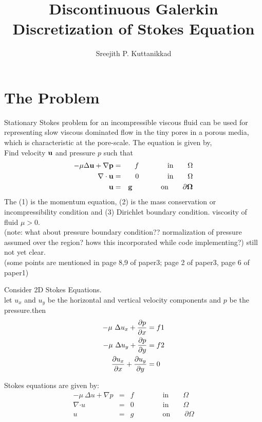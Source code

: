 \documentclass[11pt,a4paper]{article}
\begin{document}
\title {Discontinuous Galerkin Discretization of Stokes Equation} 
\author {Sreejith P. Kuttanikkad}
\maketitle

\section{The Problem}
Stationary  Stokes problem for an incompressible viscous fluid can be used 
for representing slow viscous dominated flow in the tiny pores in a porous media, 
which is characteristic at the pore-scale. The equation is given by,\\
Find velocity $\bf{u}$ and pressure $p$ such that 
\begin{eqnarray}
-\mu \Delta \bf{u}+ \nabla p &=& f \qquad\qquad\text{in} \qquad \Omega \\
\nabla \cdot \bf{u} &=& 0 \qquad\qquad\text{in}\qquad \Omega\\
\bf{u} &=& \bf{g} \qquad\qquad\text{on}\qquad\partial \Omega
\end{eqnarray}
The (1) is the momentum equation, 
(2) is the mass conservation or incompressibility condition and 
(3)  Dirichlet boundary condition. viscosity of fluid $\mu > 0 $. \\
(note: what about pressure boundary condition?? normalization of pressure assumed over the region? hows this incorporated while code implementing?) still not yet clear.\\

(some points are mentioned in page 8,9 of paper3; page 2 of paper3, page 6 of paper1)

Consider 2D Stokes Equations.\\

let $u_{x}$ and $u_{y}$ be the horizontal and vertical velocity components
and $p$ be the pressure.then\\
\begin{equation*}
\begin{aligned}
- \mu~\Delta u_{x} + {\partial p \over \partial x} &= f1\\
- \mu~\Delta u_{y} + {\partial p \over \partial y} &= f2\\
{\partial u_{x} \over \partial x}+{\partial u_{y} \over \partial y}&=0
\end{aligned}
\end {equation*}
\newpage

{Stokes equations are given by:}
\begin{eqnarray*} 
 -\mu~{\Delta{u}}+{\nabla{p}} &=& f \qquad\qquad\text {in} \qquad \Omega \\
\nabla{\cdot{u}} &=& 0 \qquad\qquad\text{in} \qquad \Omega \\
u &=& g \qquad\qquad\text{on}\qquad \partial \Omega
     \end{eqnarray*}
\end{document}

